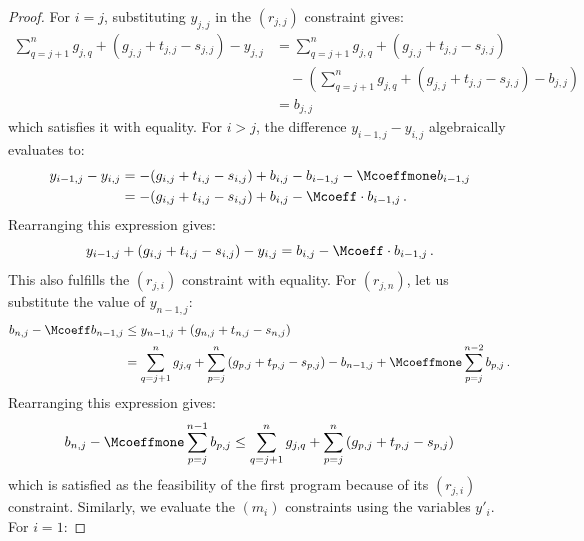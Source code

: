 \begin{proof}
    For $i=j$, substituting $y_{j,j}$ in the $(r_{j,j})$ constraint gives:
    \begin{align*}
        \sum_{q=j+1}^n g_{j,q} + (g_{j,j} + t_{j,j} - s_{j,j}) - y_{j,j}
        &=  \sum_{q=j+1}^n g_{j,q} + (g_{j,j} + t_{j,j} - s_{j,j}) \\
        &\quad - \left(\sum_{q=j+1}^n g_{j,q} + (g_{j,j} + t_{j,j} - s_{j,j}) - b_{j,j}\right) \\
        &= b_{j,j}
    \end{align*}
    which satisfies it with equality. For $i>j$, the difference $y_{i-1,j} - y_{i,j}$ algebraically evaluates to:
    \begin{align*}
        y_{i-1,j} - y_{i,j} 
        &= -(g_{i,j} + t_{i,j} - s_{i,j}) + b_{i,j} - b_{i-1,j} - \Mcoeffmone b_{i-1,j} \\
        &= -(g_{i,j} + t_{i,j} - s_{i,j}) + b_{i,j} - \Mcoeff\cdot b_{i-1,j}\,.
    \end{align*}
    Rearranging this expression gives:
    \begin{equation*}
        y_{i-1,j} + (g_{i,j} + t_{i,j} - s_{i,j}) - y_{i,j} = b_{i,j} - \Mcoeff\cdot b_{i-1,j}\,.
    \end{equation*}
    This also fulfills the $(r_{j,i})$ constraint with equality. For $(r_{j,n})$, let us substitute the value of $y_{n-1,j}$:
    \begin{align*}
        b_{n,j} - \Mcoeff b_{n-1,j}
        &\leq y_{n-1,j} + (g_{n,j} + t_{n,j} - s_{n,j}) \\
        &= \sum_{q=j+1}^n g_{j,q} + \sum_{p=j}^{n} \left(g_{p,j} + t_{p,j} - s_{p,j}\right) - b_{n-1,j} + \Mcoeffmone \sum_{p=j}^{n-2} b_{p,j}\,.
    \end{align*}
    Rearranging this expression gives:
    \begin{equation*}
        b_{n,j} - \Mcoeffmone \sum_{p=j}^{n-1} b_{p,j} \leq \sum_{q=j+1}^n g_{j,q} + \sum_{p=j}^{n} \left(g_{p,j} + t_{p,j} - s_{p,j}\right)
    \end{equation*}
    which is satisfied as the feasibility of the first program because of its $(r_{j,i})$ constraint.
    Similarly, we evaluate the $(m_i)$ constraints using the variables $y'_i$. For $i=1$:

\end{proof}
